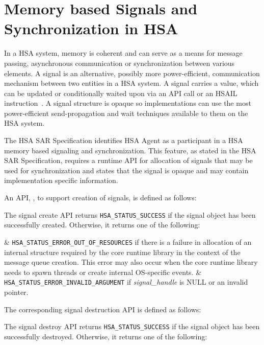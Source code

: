 \hypertarget{signals}{}\section{Memory based Signals and
Synchronization in H\-S\-A}\label{signals}

In a HSA system, memory is coherent and can
serve as a means for message passing, asynchronous communication or
synchronization between various elements.  A signal is an
alternative, possibly more power-efficient, communication mechanism
between two entities in a H\-S\-A system. A signal carries a value,
which can be updated or conditionally waited upon via an API call or
an HSAIL instruction~\cite{prm}. A signal structure is opaque so
implementations can use the most power-efficient send-propagation
and wait techniques available to them on the HSA system.  

The HSA SAR Specification \cite{sar} identifies HSA Agent as a
participant in a HSA memory based signaling and synchronization.
This feature, as stated in the HSA SAR Specification, requires a
runtime API for allocation of signals that may be used for
synchronization and states that the signal is opaque and may contain
implementation specific information.  

An API, , to support
creation of signals, is defined as follows:



The signal create API returns \texttt{HSA\_STATUS\_SUCCESS} if the
signal object has been successfully created. Otherwise, it returns
one of the following:

\begin{easylist}
& \texttt{HSA\_STATUS\_ERROR\_OUT\_OF\_RESOURCES} if there is a failure
in allocation of an internal structure required by the core runtime
library in the context of the message queue creation. This error may
also occur when the core runtime library needs to spawn threads or
create internal OS-specific events. 
& \texttt{HSA\_STATUS\_ERROR\_INVALID\_ARGUMENT} if {\itshape
signal\_handle} is NULL or an invalid pointer.
\end{easylist}

The corresponding signal destruction API is defined as follows:


The signal destroy API returns \texttt{HSA\_STATUS\_SUCCESS} if the
signal object has been successfully destroyed. Otherwise, it returns
one of the following:

